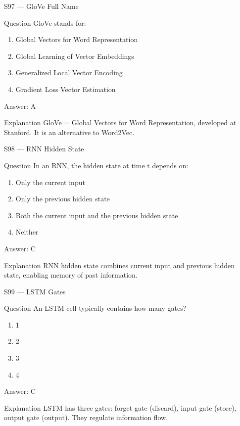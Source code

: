 \documentclass[aspectratio=169,8pt]{beamer}
\begin{document}
	\begin{frame}{S97 --- GloVe Full Name}
		\begin{block}{Question}
			GloVe stands for:
			\begin{enumerate}
				\item Global Vectors for Word Representation
				\item Global Learning of Vector Embeddings
				\item Generalized Local Vector Encoding
				\item Gradient Loss Vector Estimation
			\end{enumerate}
		\end{block}
		\begin{exampleblock}{Answer: A}\end{exampleblock}
		\begin{block}{Explanation}
			GloVe = Global Vectors for Word Representation, developed at Stanford. It is an alternative to Word2Vec.
		\end{block}
	\end{frame}
	
	\begin{frame}{S98 --- RNN Hidden State}
		\begin{block}{Question}
			In an RNN, the hidden state at time t depends on:
			\begin{enumerate}
				\item Only the current input
				\item Only the previous hidden state
				\item Both the current input and the previous hidden state
				\item Neither
			\end{enumerate}
		\end{block}
		\begin{exampleblock}{Answer: C}\end{exampleblock}
		\begin{block}{Explanation}
			RNN hidden state combines current input and previous hidden state, enabling memory of past information.
		\end{block}
	\end{frame}
	
	\begin{frame}{S99 --- LSTM Gates}
		\begin{block}{Question}
			An LSTM cell typically contains how many gates?
			\begin{enumerate}
				\item 1
				\item 2
				\item 3
				\item 4
			\end{enumerate}
		\end{block}
		\begin{exampleblock}{Answer: C}\end{exampleblock}
		\begin{block}{Explanation}
			LSTM has three gates: forget gate (discard), input gate (store), output gate (output). They regulate information flow.
		\end{block}
	\end{frame}
	
\end{document}

